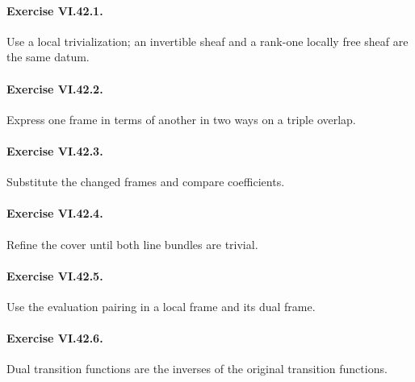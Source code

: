 \paragraph{Exercise VI.42.1.}
\begin{hint}
Use a local trivialization; an invertible sheaf and a rank-one locally free sheaf are the same datum.
\end{hint}

\paragraph{Exercise VI.42.2.}
\begin{hint}
Express one frame in terms of another in two ways on a triple overlap.
\end{hint}

\paragraph{Exercise VI.42.3.}
\begin{hint}
Substitute the changed frames and compare coefficients.
\end{hint}

\paragraph{Exercise VI.42.4.}
\begin{hint}
Refine the cover until both line bundles are trivial.
\end{hint}

\paragraph{Exercise VI.42.5.}
\begin{hint}
Use the evaluation pairing in a local frame and its dual frame.
\end{hint}

\paragraph{Exercise VI.42.6.}
\begin{hint}
Dual transition functions are the inverses of the original transition functions.
\end{hint}

